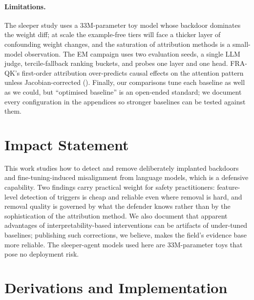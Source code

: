 \documentclass{article}
\theoremstyle{plain}
\theoremstyle{definition}
\theoremstyle{remark}
\begin{document}
\paragraph{Limitations.} The sleeper study uses a 33M-parameter toy model whose backdoor dominates the weight diff; at scale the example-free tiers will face a thicker layer of confounding weight changes, and the saturation of attribution methods is a small-model observation. The EM campaign uses two evaluation seeds, a single LLM judge, tercile-fallback ranking buckets, and probes one layer and one head. FRA-QK's first-order attribution over-predicts causal effects on the attention pattern unless Jacobian-corrected (). Finally, our comparisons tune each baseline as well as we could, but ``optimised baseline'' is an open-ended standard; we document every configuration in the appendices so stronger baselines can be tested against them.


\section*{Impact Statement}
This work studies how to detect and remove deliberately implanted backdoors and fine-tuning-induced misalignment from language models, which is a defensive capability. Two findings carry practical weight for safety practitioners: feature-level detection of triggers is cheap and reliable even where removal is hard, and removal quality is governed by what the defender knows rather than by the sophistication of the attribution method. We also document that apparent advantages of interpretability-based interventions can be artifacts of under-tuned baselines; publishing such corrections, we believe, makes the field's evidence base more reliable. The sleeper-agent models used here are 33M-parameter toys that pose no deployment risk.






\newpage
\appendix
\section{Derivations and Implementation}
\label{app:derivations}
\end{document}

